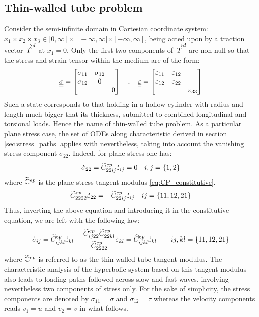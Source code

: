 \subsection{Thin-walled tube problem}
Consider the semi-infinite domain in Cartesian coordinate system: $x_1 \times x_2 \times x_3 \in [0,\infty[ \times ]-\infty,\infty[ \times [-\infty,\infty]$, being acted upon by a traction vector ${\overrightarrow{T}}^d$ at $x_1=0 $.
Only the first two components of ${\overrightarrow{T}}^d$ are non-null so that the stress and strain tensor within the medium are of the form:
\begin{equation}
  {\underline{\underline{\sigma}}} = \left[\begin{matrix}\sigma_{11} & \sigma_{12} & \\ \sigma_{12} & 0 & \\ & & 0\end{matrix}\right] \quad ;\quad{\underline{\underline{\varepsilon}}} = \left[\begin{matrix}\varepsilon_{11} & \varepsilon_{12} & \\ \varepsilon_{12} & \varepsilon_{22}& \\ & & \varepsilon_{33}\end{matrix}\right]
\end{equation}
Such a state corresponds to that holding in a hollow cylinder with radius and length much bigger that its thickness, submitted to combined longitudinal and torsional loads.
Hence the name of thin-walled tube problem. 
As a particular plane stress case, the set of ODEs along characteristic derived in section \ref{sec:stress_paths} applies with nevertheless, taking into account the vanishing stress component $\sigma_{22}$.
Indeed, for plane stress one has:
\begin{equation*}
  \dot{\sigma}_{22}=\widetilde{C}^{ep}_{22ij} \dot{\varepsilon}_{ij} =0 \quad i,j=\{1,2\}
\end{equation*}
where $\widetilde{\mathbb{C}}^{ep}$ is the plane stress tangent modulus \eqref{eq:CP_constitutive}.
\begin{equation*}
  \widetilde{C}^{ep}_{2222} \dot{\varepsilon}_{22} = - \widetilde{C}^{ep}_{22ij}\dot{\varepsilon}_{ij} \quad ij=\{11,12,21\}
\end{equation*}
Thus, inverting the above equation and introducing it in the constitutive equation, we are left with the following law:
\begin{equation}
  \label{eq:ch5_TW_tangent}
  \dot{\sigma}_{ij}=\widetilde{C}^{ep}_{ijkl} \dot{\varepsilon}_{kl} - \frac{\widetilde{C}^{ep}_{ij22}\widetilde{C}^{ep}_{22kl}}{\widetilde{C}^{ep}_{2222}}\dot{\varepsilon}_{kl}= \widehat{C}^{ep}_{ijkl} \dot{\varepsilon}_{kl}\qquad ij,kl=\{11,12,21\} 
\end{equation}
where $\widetilde{\mathbb{C}}^{ep}$ is referred to as the thin-walled tube tangent modulus.
The characteristic analysis of the hyperbolic system based on this tangent modulus also leads to loading paths followed across slow and fast waves, involving nevertheless two components of stress only. For the sake of simplicity, the stress components are denoted by $\sigma_{11}=\sigma$ and $\sigma_{12}=\tau$ whereas the velocity components reads $v_1=u$ and $v_2=v$ in what follows.

